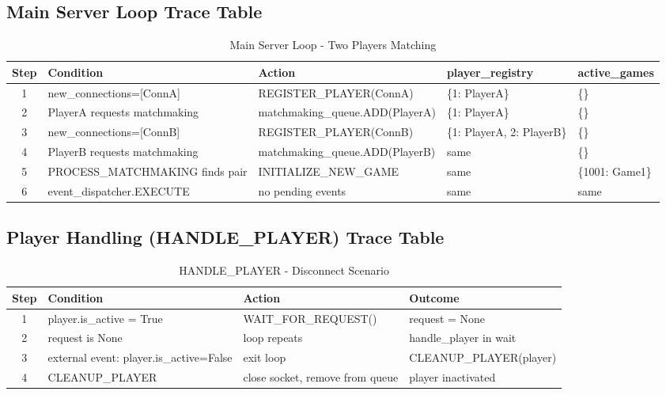 \documentclass{article}
\begin{document}
\subsection{Main Server Loop Trace Table}
\begin{table}[H]
\centering
\footnotesize
\begin{tabular}{|c|p{3.2cm}|p{4cm}|p{2.5cm}|p{2.5cm}|}
\hline
\textbf{Step} & \textbf{Condition} & \textbf{Action} & \textbf{player\_registry} & \textbf{active\_games} \\
\hline
1 & new\_connections=[ConnA] & REGISTER\_PLAYER(ConnA) & \{1: PlayerA\} & \{\} \\
\hline
2 & PlayerA requests matchmaking & matchmaking\_queue.ADD(PlayerA) & \{1: PlayerA\} & \{\} \\
\hline
3 & new\_connections=[ConnB] & REGISTER\_PLAYER(ConnB) & \{1: PlayerA, 2: PlayerB\} & \{\} \\
\hline
4 & PlayerB requests matchmaking & matchmaking\_queue.ADD(PlayerB) & same & \{\} \\
\hline
5 & PROCESS\_MATCHMAKING finds pair & INITIALIZE\_NEW\_GAME & same & \{1001: Game1\} \\
\hline
6 & event\_dispatcher.EXECUTE & no pending events & same & same \\
\hline
\end{tabular}
\caption{Main Server Loop - Two Players Matching}
\end{table}

\subsection{Player Handling (HANDLE\_PLAYER) Trace Table}
\begin{table}[H]
\centering
\footnotesize
\begin{tabular}{|c|p{4cm}|p{4cm}|p{2.5cm}|}
\hline
\textbf{Step} & \textbf{Condition} & \textbf{Action} & \textbf{Outcome}\\
\hline
1 & player.is\_active = True & WAIT\_FOR\_REQUEST() & request = None \\
\hline
2 & request is None & loop repeats & handle\_player in wait \\
\hline
3 & external event: player.is\_active=False & exit loop & CLEANUP\_PLAYER(player) \\
\hline
4 & CLEANUP\_PLAYER & close socket, remove from queue & player inactivated \\
\hline
\end{tabular}
\caption{HANDLE\_PLAYER - Disconnect Scenario}
\end{table}
\end{document}

